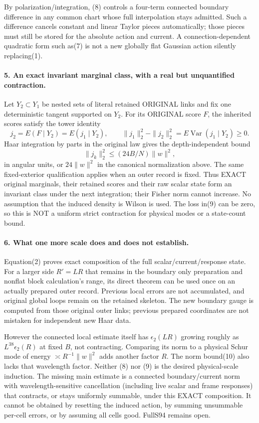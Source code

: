 \documentclass[11pt]{article}
\begin{document}
By polarization/integration, (8) controls a four-term connected boundary
difference in any common chart whose full interpolation stays admitted.
Such a difference cancels constant and linear Taylor pieces automatically;
those pieces must still be stored for the absolute action and current.
A connection-dependent quadratic form such as(7) is not a new globally flat
Gaussian action silently replacing(1).

\paragraph{5. An exact invariant marginal class, with a real but unquantified contraction.}
Let $Y_2\subset Y_1$ be nested sets of literal retained ORIGINAL links and fix
one deterministic tangent supported on $Y_2$. For its ORIGINAL score $F$, the
inherited scores satisfy the tower identity
\[
 j_2=E(F\mid Y_2)=E(j_1\mid Y_2),\qquad
 \|j_1\|_2^2-\|j_2\|_2^2=E\operatorname{Var}(j_1\mid Y_2)\ge0.          \tag{9}
\]
Haar integration by parts in the original law gives the depth-independent bound
\[
 \|j_k\|_2^2\le (24B/N)\|w\|^2,                                      \tag{10}
\]
in angular units, or $24\|w\|^2$ in the canonical normalization above.
The same fixed-exterior qualification applies when an outer record is fixed.
Thus EXACT original marginals, their retained scores and their raw scalar
state form an invariant class under the next integration; their Fisher norm
cannot increase. No assumption that the induced density is Wilson is used.
The loss in(9) can be zero, so this is NOT a uniform strict contraction for
physical modes or a state-count bound.

\paragraph{6. What one more scale does and does not establish.}
Equation(2) proves exact composition of the full scalar/current/response state.
For a larger side $R'=LR$ that remains in the boundary only preparation and nonflat block calculation's range, its direct theorem
can be used once on an actually prepared outer record. Previous local errors
are not accumulated, and original global loops remain on the retained
skeleton. The new boundary gauge is computed from those original outer links;
previous prepared coordinates are not mistaken for independent new Haar data.

However the connected local estimate itself has
$\epsilon_2(LR)$ growing roughly as $L^{38}\epsilon_2(R)$ at fixed $B$,
not contracting. Comparing its norm to a physical Schur mode of energy
$\asymp R^{-1}\|w\|^2$ adds another factor $R$. The norm bound(10) also lacks
that wavelength factor. Neither (8) nor (9) is the desired physical-scale
induction. The missing main estimate is a connected boundary/current norm
with wavelength-sensitive cancellation (including live scalar and frame
responses) that contracts, or stays uniformly summable, under this EXACT
composition. It cannot be obtained by resetting the induced action, by
summing unsummable per-cell errors, or by assuming all cells good. FullS94
remains open.
\end{document}
